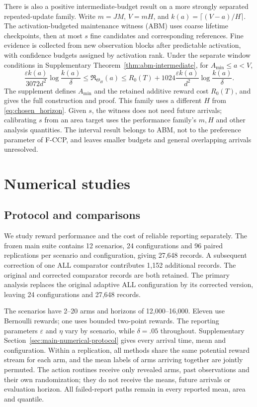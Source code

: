 \documentclass[11pt]{article}
\theoremstyle{remark}
\begin{document}
There is also a positive intermediate-budget result on a more strongly
separated repeated-update family. Write $m=JM$, $V=mH$, and
$k(a)=\lceil(V-a)/H\rceil$. The activation-budgeted maintenance witness
(ABM) uses coarse lifetime checkpoints, then at most $s$ fine candidates
and corresponding references. Fine evidence is collected from new
observation blocks after predictable activation, with confidence budgets
assigned by activation rank. Under the separate window conditions in
Supplementary Theorem~\ref{thm:abm-intermediate}, for
$A_{\min}\le a<V$,
\[
 \frac{\varepsilon k(a)}{3072d^2}\log\frac{k(a)}\delta
 \le\mathfrak R_{\Theta_H}(a)
 \le R_0(T)+1024\frac{\varepsilon k(a)}{d^2}\log\frac{k(a)}\delta.
\]
The supplement defines $A_{\min}$ and the retained additive reward cost
$R_0(T)$, and gives the full construction and proof. This family uses a
different $H$ from \eqref{eq:chosen_horizon}. Given $s$, the witness does
not need future arrivals; calibrating $s$ from an area target uses the
performance family's $m,H$ and other analysis quantities. The interval
result belongs to ABM, not to the preference parameter of F-CCP, and
leaves smaller budgets and general overlapping arrivals unresolved.
\section{Numerical studies}\label{sec:experiments}
\subsection{Protocol and comparisons}
We study reward performance and the cost of reliable reporting separately. The frozen main suite contains 12 scenarios, 24 configurations and 96 paired replications per scenario and configuration, giving 27,648 records. A subsequent correction of one ALL comparator contributes 1,152 additional records. The original and corrected comparator records are both retained. The primary analysis replaces the original adaptive ALL configuration by its corrected version, leaving 24 configurations and 27,648 records.

The scenarios have 2--20 arms and horizons of 12,000--16,000. Eleven use Bernoulli rewards; one uses bounded two-point rewards. The reporting parameters $\varepsilon$ and $\eta$ vary by scenario, while $\delta=.05$ throughout. Supplementary Section~\ref{sec:main-numerical-protocol} gives every arrival time, mean and configuration. Within a replication, all methods share the same potential reward stream for each arm, and the mean labels of arms arriving together are jointly permuted. The action routines receive only revealed arms, past observations and their own randomization; they do not receive the means, future arrivals or evaluation horizon. All failed-report paths remain in every reported mean, area and quantile.
\end{document}

